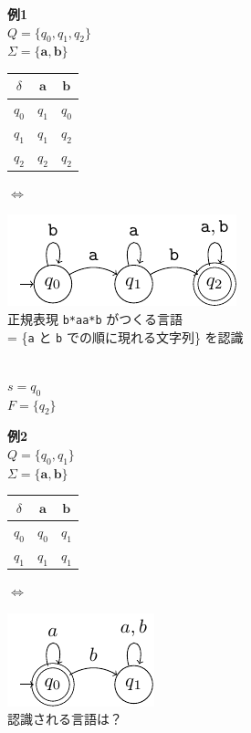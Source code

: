 \documentclass[main]{subfiles}
\begin{document}
\begin{tcolorbox}[
  enhanced,
  coltitle=black,
  attach boxed title to top left={xshift=3mm, yshift=-\tcboxedtitleheight/2},
  colback=white,
  title=DFA の例:,
  boxed title style={size=small,colframe=white,colback=white}
]
\small
\textbf{例1}\\
$Q = \{q_0, q_1, q_2\}$\\
$\Sigma = \{\mathbf{a,b}\}$\\[-14pt]
\begin{tabular}{c|cc}
$\delta$ & $\mathbf{a}$ & $\mathbf{b}$ \\
\hline
$q_0$ & $q_1$ & $q_0$ \\
$q_1$ & $q_1$ & $q_2$ \\
$q_2$ & $q_2$ & $q_2$ \\
\end{tabular}
\hspace{5mm} $\Leftrightarrow$
\begin{minipage}{0.45\textwidth}
  \includegraphics{figures/dfa1.pdf}\\[2mm]
  \small{正規表現 \texttt{b*aa*b} がつくる言語 \\= \{\texttt{a} と \texttt{b} での順に現れる文字列\} を認識}
\end{minipage}\\[-20pt]

$s = q_0$\\
$F = \{q_2\}$

\textbf{例2}\\
$Q = \{q_0, q_1\}$\\
$\Sigma = \{\mathbf{a,b}\}$\\[-14pt]
\begin{tabular}{c|cc}
$\delta$ & $\mathbf{a}$ & $\mathbf{b}$ \\
\hline
$q_0$ & $q_0$ & $q_1$ \\
$q_1$ & $q_1$ & $q_1$ \\
\end{tabular}
\hspace{5mm} $\Leftrightarrow$ 
\begin{minipage}{0.45\textwidth}
  
  \includegraphics{figures/dfa2.pdf}\\[2mm]
  \small{認識される言語は？}
\end{minipage}\\[-20pt]


\end{tcolorbox}
\end{document}
